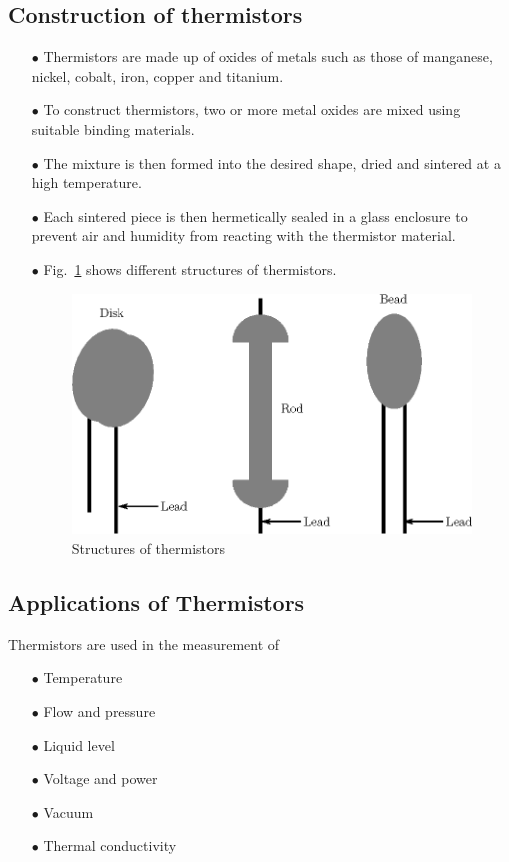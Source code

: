\subsection{Construction of thermistors}\label{sec8.9.1}
\begin{itemize}
\item[$\bullet$] Thermistors are made up of oxides of metals such as those of manganese, nickel, cobalt, iron, copper and titanium.

\item[$\bullet$] To construct thermistors, two or more metal oxides are mixed using suitable binding materials.

\item[$\bullet$] The mixture is then formed into the desired shape, dried and sintered at a high temperature.

\item[$\bullet$] Each sintered piece is then hermetically sealed in a glass enclosure to prevent air and humidity from reacting with the thermistor material.

\item[$\bullet$] Fig.~\ref{fig8.11} shows different structures of thermistors.
\begin{figure}[H]
\centering
\includegraphics{chap8/fig8.11.eps}
\caption{Structures of thermistors}\label{fig8.11}
\end{figure}
\end{itemize}

\subsection{Applications of Thermistors}\label{sec8.9.2}

Thermistors are used in the measurement of
\begin{itemize}
\item[$\bullet$] Temperature

\item[$\bullet$] Flow and pressure

\item[$\bullet$] Liquid level

\item[$\bullet$] Voltage and power

\item[$\bullet$] Vacuum

\item[$\bullet$] Thermal conductivity
\end{itemize}

